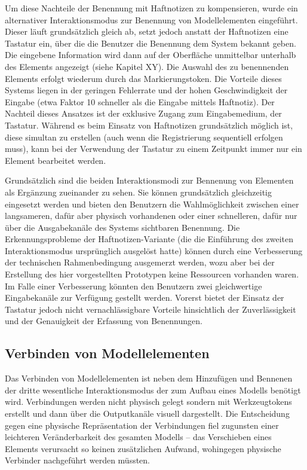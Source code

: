 Um diese Nachteile der Benennung mit Haftnotizen zu kompensieren, wurde ein alternativer Interaktionsmodus zur Benennung von Modellelementen eingeführt. Dieser läuft grundsätzlich gleich ab, setzt jedoch anstatt der Haftnotizen eine Tastatur ein, über die die Benutzer die Benennung dem System bekannt geben. Die eingebene Information wird dann auf der Oberfläche unmittelbar unterhalb des Elements angezeigt (siehe Kapitel XY). Die Auswahl des zu benennenden Elements erfolgt wiederum durch das Markierungstoken. Die Vorteile dieses Systems liegen in der geringen Fehlerrate und der hohen Geschwindigkeit der Eingabe (etwa Faktor 10 schneller als die Eingabe mittels Haftnotiz). Der Nachteil dieses Ansatzes ist der exklusive Zugang zum Eingabemedium, der Tastatur. Während es beim Einsatz von Haftnotizen grundsätzlich möglich ist, diese simultan zu erstellen (auch wenn die Registrierung sequentiell erfolgen muss), kann bei der Verwendung der Tastatur zu einem Zeitpunkt immer nur ein Element bearbeitet werden.

Grundsätzlich sind die beiden Interaktionsmodi zur Bennenung von Elementen als Ergänzung zueinander zu sehen. Sie können grundsätzlich gleichzeitig eingesetzt werden und bieten den Benutzern die Wahlmöglichkeit zwischen einer langsameren, dafür aber physisch vorhandenen oder einer schnelleren, dafür nur über die Ausgabekanäle des Systems sichtbaren Benennung. Die Erkennungsprobleme der Haftnotizen-Variante (die die Einführung des zweiten Interaktionsmodus ursprünglich ausgelöst hatte) können durch eine Verbesserung der technischen Rahmenbedingung ausgemerzt werden, wozu aber bei der Erstellung des hier vorgestellten Prototypen keine Ressourcen vorhanden waren. Im Falle einer Verbesserung könnten den Benutzern zwei gleichwertige Eingabekanäle zur Verfügung gestellt werden. Vorerst bietet der Einsatz der Tastatur jedoch nicht vernachlässigbare Vorteile hinsichtlich der Zuverlässigkeit und der Genauigkeit der Erfassung von Benennungen.


\subsection{Verbinden von Modellelementen} %
\label{sub:verbinden_von_modellelementen}

Das Verbinden von Modellelementen ist neben dem Hinzufügen und Bennenen der dritte wesentliche Interaktionsmodus der zum Aufbau eines Modells benötigt wird. Verbindungen werden nicht physisch gelegt sondern mit Werkzeugtokens erstellt und dann über die Outputkanäle visuell dargestellt. Die Entscheidung gegen eine physische Repräsentation der Verbindungen fiel zugunsten einer leichteren Veränderbarkeit des gesamten Modells -- das Verschieben eines Elements verursacht so keinen zusätzlichen Aufwand, wohingegen physische Verbinder nachgeführt werden müssten.

